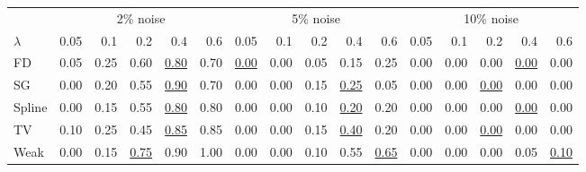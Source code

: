 \begin{tabular}{l|rrrrr|rrrrr|rrrrr}\toprule
 & \multicolumn{5}{c}{2\% noise} & \multicolumn{5}{c}{5\% noise} & \multicolumn{5}{c}{10\% noise} \\
$\lambda$ & 0.05 & 0.1 & 0.2 & 0.4 & 0.6 & 0.05 & 0.1 & 0.2 & 0.4 & 0.6 & 0.05 & 0.1 & 0.2 & 0.4 & 0.6 \\\midrule
FD & 0.05 & 0.25 & 0.60 & \colorbox{black!15}{\underline{0.80}} & 0.70 & \underline{0.00} & \colorbox{black!15}{0.00} & 0.05 & 0.15 & 0.25 & 0.00 & 0.00 & 0.00 & \underline{0.00} & \colorbox{black!15}{0.00} \\
SG & 0.00 & 0.20 & 0.55 & \colorbox{black!15}{\underline{0.90}} & 0.70 & 0.00 & 0.00 & 0.15 & \colorbox{black!15}{\underline{0.25}} & 0.05 & 0.00 & 0.00 & \colorbox{black!15}{\underline{0.00}} & 0.00 & 0.00 \\
Spline & 0.00 & 0.15 & 0.55 & \colorbox{black!15}{\underline{0.80}} & 0.80 & 0.00 & 0.00 & 0.10 & \colorbox{black!15}{\underline{0.20}} & 0.20 & 0.00 & 0.00 & 0.00 & \underline{0.00} & \colorbox{black!15}{0.00} \\
TV & 0.10 & 0.25 & 0.45 & \colorbox{black!15}{\underline{0.85}} & 0.85 & 0.00 & 0.00 & 0.15 & \colorbox{black!15}{\underline{0.40}} & 0.20 & 0.00 & 0.00 & \colorbox{black!15}{\underline{0.00}} & 0.00 & 0.00 \\
Weak & 0.00 & 0.15 & \underline{0.75} & 0.90 & \colorbox{black!15}{1.00} & 0.00 & 0.00 & 0.10 & 0.55 & \colorbox{black!15}{\underline{0.65}} & 0.00 & 0.00 & 0.00 & 0.05 & \colorbox{black!15}{\underline{0.10}} \\
\bottomrule\end{tabular}
